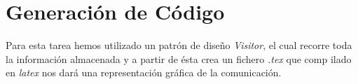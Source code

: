 
\section{Generación de Código}

Para esta tarea hemos utilizado un patrón de diseño \textit{Visitor},
el cual recorre toda la información almacenada y a partir de ésta crea
un fichero \textit{.tex} que comp ilado en \textit{latex} nos dará una
representación gráfica de la comunicación.

